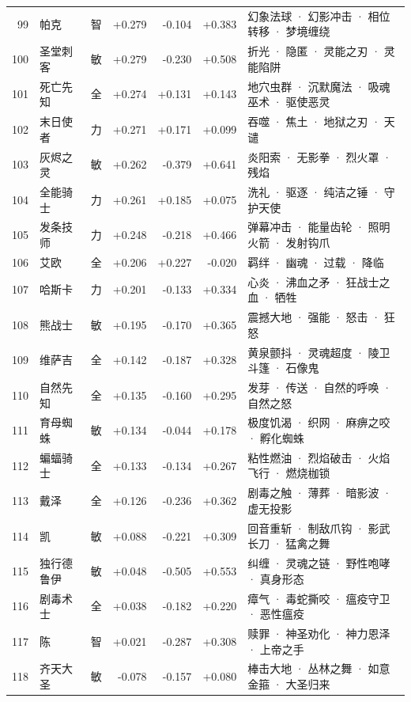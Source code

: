 \documentclass[10pt,a4paper]{article}
\begin{document}
{\begin{longtable}{@{}rlcrrrp{7.6cm}@{}}
99 & 帕克 & 智 & +0.279 & -0.104 & +0.383 & \small 幻象法球 · 幻影冲击 · 相位转移 · 梦境缠绕 \\
100 & 圣堂刺客 & 敏 & +0.279 & -0.230 & +0.508 & \small 折光 · 隐匿 · 灵能之刃 · 灵能陷阱 \\
101 & 死亡先知 & 全 & +0.274 & +0.131 & +0.143 & \small 地穴虫群 · 沉默魔法 · 吸魂巫术 · 驱使恶灵 \\
102 & 末日使者 & 力 & +0.271 & +0.171 & +0.099 & \small 吞噬 · 焦土 · 地狱之刃 · 天谴 \\
103 & 灰烬之灵 & 敏 & +0.262 & -0.379 & +0.641 & \small 炎阳索 · 无影拳 · 烈火罩 · 残焰 \\
104 & 全能骑士 & 力 & +0.261 & +0.185 & +0.075 & \small 洗礼 · 驱逐 · 纯洁之锤 · 守护天使 \\
105 & 发条技师 & 力 & +0.248 & -0.218 & +0.466 & \small 弹幕冲击 · 能量齿轮 · 照明火箭 · 发射钩爪 \\
106 & 艾欧 & 全 & +0.206 & +0.227 & -0.020 & \small 羁绊 · 幽魂 · 过载 · 降临 \\
107 & 哈斯卡 & 力 & +0.201 & -0.133 & +0.334 & \small 心炎 · 沸血之矛 · 狂战士之血 · 牺牲 \\
108 & 熊战士 & 敏 & +0.195 & -0.170 & +0.365 & \small 震撼大地 · 强能 · 怒击 · 狂怒 \\
109 & 维萨吉 & 全 & +0.142 & -0.187 & +0.328 & \small 黄泉颤抖 · 灵魂超度 · 陵卫斗篷 · 石像鬼 \\
110 & 自然先知 & 全 & +0.135 & -0.160 & +0.295 & \small 发芽 · 传送 · 自然的呼唤 · 自然之怒 \\
111 & 育母蜘蛛 & 敏 & +0.134 & -0.044 & +0.178 & \small 极度饥渴 · 织网 · 麻痹之咬 · 孵化蜘蛛 \\
112 & 蝙蝠骑士 & 全 & +0.133 & -0.134 & +0.267 & \small 粘性燃油 · 烈焰破击 · 火焰飞行 · 燃烧枷锁 \\
113 & 戴泽 & 全 & +0.126 & -0.236 & +0.362 & \small 剧毒之触 · 薄葬 · 暗影波 · 虚无投影 \\
114 & 凯 & 敏 & +0.088 & -0.221 & +0.309 & \small 回音重斩 · 制敌爪钩 · 影武长刀 · 猛禽之舞 \\
115 & 独行德鲁伊 & 敏 & +0.048 & -0.505 & +0.553 & \small 纠缠 · 灵魂之链 · 野性咆哮 · 真身形态 \\
116 & 剧毒术士 & 全 & +0.038 & -0.182 & +0.220 & \small 瘴气 · 毒蛇撕咬 · 瘟疫守卫 · 恶性瘟疫 \\
117 & 陈 & 智 & +0.021 & -0.287 & +0.308 & \small 赎罪 · 神圣劝化 · 神力恩泽 · 上帝之手 \\
118 & 齐天大圣 & 敏 & -0.078 & -0.157 & +0.080 & \small 棒击大地 · 丛林之舞 · 如意金箍 · 大圣归来 \\
\bottomrule
\end{longtable}}

\vspace{4pt}
\end{document}
